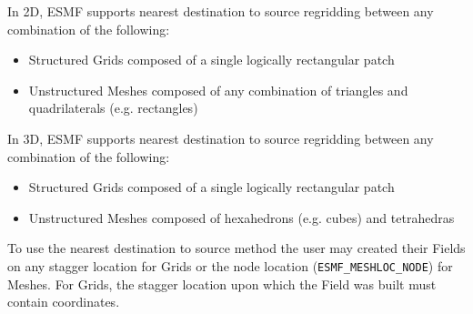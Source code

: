 \smallskip

 In 2D, ESMF supports nearest destination to source regridding between any combination of the following:
 \begin{itemize}
 \item Structured Grids composed of a single logically rectangular patch
 \item Unstructured Meshes composed of any combination of triangles and quadrilaterals (e.g. rectangles)
 \end{itemize}

\smallskip

 In 3D, ESMF supports nearest destination to source regridding between any combination of the following:
 \begin{itemize}
 \item Structured Grids composed of a single logically rectangular patch
 \item Unstructured Meshes composed of hexahedrons (e.g. cubes) and tetrahedras
 \end{itemize}

\smallskip

 To use the nearest destination to source method the user may created their Fields on any stagger location for Grids or the node location ({\tt ESMF\_MESHLOC\_NODE}) for Meshes.
 For Grids, the stagger location upon which the Field was built must contain coordinates. 


